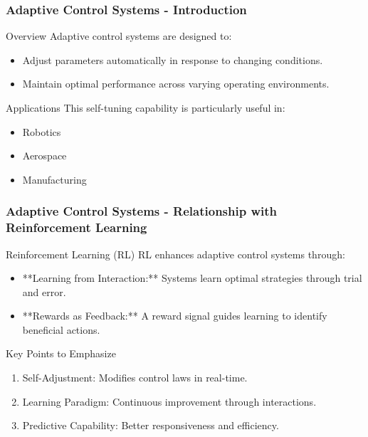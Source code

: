 \documentclass[aspectratio=169]{beamer}
\begin{document}
\begin{frame}[fragile]
    \frametitle{Adaptive Control Systems - Introduction}
    \begin{block}{Overview}
        Adaptive control systems are designed to:
        \begin{itemize}
            \item Adjust parameters automatically in response to changing conditions.
            \item Maintain optimal performance across varying operating environments.
        \end{itemize}
    \end{block}
    \begin{block}{Applications}
        This self-tuning capability is particularly useful in:
        \begin{itemize}
            \item Robotics
            \item Aerospace
            \item Manufacturing
        \end{itemize}
    \end{block}
\end{frame}

\begin{frame}[fragile]
    \frametitle{Adaptive Control Systems - Relationship with Reinforcement Learning}
    \begin{block}{Reinforcement Learning (RL)}
        RL enhances adaptive control systems through:
        \begin{itemize}
            \item **Learning from Interaction:** Systems learn optimal strategies through trial and error.
            \item **Rewards as Feedback:** A reward signal guides learning to identify beneficial actions.
        \end{itemize}
    \end{block}
    \begin{block}{Key Points to Emphasize}
        \begin{enumerate}
            \item Self-Adjustment: Modifies control laws in real-time.
            \item Learning Paradigm: Continuous improvement through interactions.
            \item Predictive Capability: Better responsiveness and efficiency.
        \end{enumerate}
    \end{block}
\end{frame}
\end{document}
